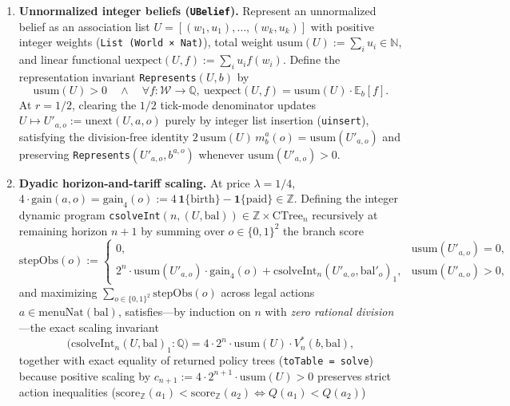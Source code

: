\documentclass[11pt,a4paper]{article}
\providecommand{\tightlist}{\setlength{\itemsep}{2pt}\setlength{\parskip}{0pt}}
\begin{document}
\begin{enumerate}
\def\labelenumi{\arabic{enumi}.}
\tightlist
\item
  \textbf{Unnormalized integer beliefs (\texttt{UBelief}).} Represent an
  unnormalized belief as an association list
  \(U = [(w_1, u_1), \dots, (w_k, u_k)]\) with positive integer weights
  (\texttt{List\ (World\ ×\ Nat)}), total weight
  \(\mathrm{usum}(U) := \sum_i u_i \in \mathbb{N}\), and linear
  functional \(\mathrm{uexpect}(U, f) := \sum_i u_i f(w_i)\). Define the
  representation invariant \texttt{Represents}\((U, b)\) by
  \[\mathrm{usum}(U) > 0 \quad \land \quad \forall f: \mathcal{W} \to \mathbb{Q},\ \mathrm{uexpect}(U, f) = \mathrm{usum}(U) \cdot \mathbb{E}_b[f].\]
  At \(r = 1/2\), clearing the \(1/2\) tick-mode denominator updates
  \(U \mapsto U'_{a,o} := \mathrm{unext}(U, a, o)\) purely by integer
  list insertion (\texttt{uinsert}), satisfying the division-free
  identity \(2\,\mathrm{usum}(U)\, m_b^a(o) = \mathrm{usum}(U'_{a,o})\)
  and preserving \texttt{Represents}\((U'_{a,o}, b^{a,o})\) whenever
  \(\mathrm{usum}(U'_{a,o}) > 0\).
\item
  \textbf{Dyadic horizon-and-tariff scaling.} At price
  \(\lambda = 1/4\),
  \(4 \cdot \mathrm{gain}(a,o) = \mathrm{gain}_4(o) := 4\,\mathbf{1}\{\mathrm{birth}\} - \mathbf{1}\{\mathrm{paid}\} \in \mathbb{Z}\).
  Defining the integer dynamic program
  \texttt{csolveInt}\((n, (U, \mathrm{bal})) \in \mathbb{Z} \times \mathrm{CTree}_n\)
  recursively at remaining horizon \(n+1\) by summing over
  \(o \in \{0,1\}^2\) the branch score
  \[\mathrm{stepObs}(o) := \begin{cases}
  0, & \mathrm{usum}(U'_{a,o}) = 0, \\
  2^n \cdot \mathrm{usum}(U'_{a,o}) \cdot \mathrm{gain}_4(o) + \mathrm{csolveInt}_n(U'_{a,o}, \mathrm{bal}'_o)_1, & \mathrm{usum}(U'_{a,o}) > 0,
  \end{cases}\] and maximizing
  \(\sum_{o \in \{0,1\}^2} \mathrm{stepObs}(o)\) across legal actions
  \(a \in \mathrm{menuNat}(\mathrm{bal})\), satisfies---by induction on
  \(n\) with \emph{zero rational division}---the exact scaling invariant
  \[\bigl(\mathrm{csolveInt}_n(U, \mathrm{bal})_1 : \mathbb{Q}\bigr) = 4 \cdot 2^n \cdot \mathrm{usum}(U) \cdot V_n^*(b, \mathrm{bal}),\]
  together with exact equality of returned policy trees
  (\texttt{toTable\ =\ solve}) because positive scaling by
  \(c_{n+1} := 4 \cdot 2^{n+1} \cdot \mathrm{usum}(U) > 0\) preserves
  strict action inequalities
  (\(\mathrm{score}_{\mathbb{Z}}(a_1) < \mathrm{score}_{\mathbb{Z}}(a_2) \iff Q(a_1) < Q(a_2)\))

\end{enumerate}
\end{document}
